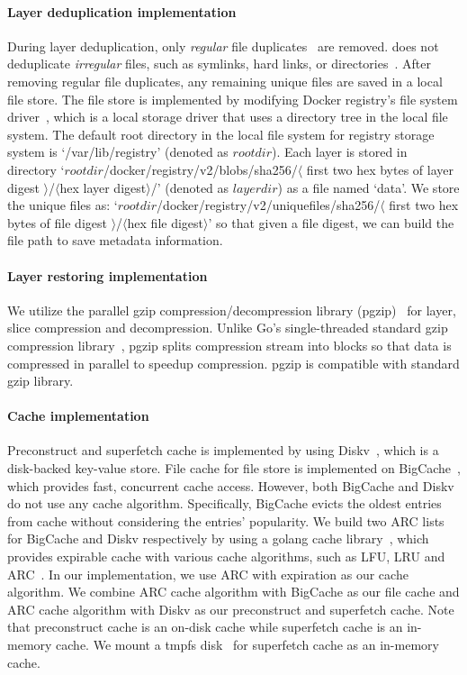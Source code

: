 \paragraph{Layer deduplication implementation}
During layer deduplication, only \emph{regular} file duplicates~\cite{xxx} are removed.
\sysname does not deduplicate \emph{irregular} files, such as symlinks, hard links, or directories~\cite{xxx}.
After removing regular file duplicates, any remaining unique files are saved in a local file store.
The file store is implemented by modifying Docker registry's file system driver~\cite{dockerfs},
which is a local storage driver 
that uses a directory tree in the local file system.
The default root directory in the local file system for registry storage system is `/var/lib/registry' (denoted as $rootdir$).
Each layer is stored in directory
`$rootdir$/docker/registry/v2/blobs/sha256/$\langle$
first two hex bytes of layer digest
$\rangle$/$\langle$hex layer digest$\rangle$/'
(denoted as $layerdir$) as a file named `data'.
We store the unique files as:
`$rootdir$/docker/registry/v2/uniquefiles/sha256/$\langle$
first two hex bytes of file digest
$\rangle$/$\langle$hex file digest$\rangle$'
so that given a file digest, we can build the file path to save metadata information.

\paragraph{Layer restoring implementation}
We utilize the parallel gzip compression/decompression library (pgzip)~\cite{pgzip}
for layer, slice compression and decompression.
Unlike Go's single-threaded standard gzip compression library~\cite{gogzip},
pgzip splits compression stream into blocks so that data is compressed in
parallel to speedup compression. pgzip is compatible with standard gzip library.

\paragraph{Cache implementation}

Preconstruct and superfetch cache is implemented by using Diskv~\cite{diskv},
which is a disk-backed key-value store.
File cache for file store is implemented on BigCache~\cite{bigcache},
which provides fast, concurrent cache access.
However, both BigCache and Diskv do not use any cache algorithm.
Specifically, BigCache evicts the oldest entries from cache without considering the entries' popularity.
We build two ARC lists for BigCache and Diskv respectively by using a golang cache library~\cite{xxx},
which provides expirable cache with various cache algorithms, such as LFU, LRU and ARC~\cite{megiddo2003arc}.
In our implementation, we use ARC with expiration as our cache algorithm.
We combine ARC cache algorithm with BigCache as our file cache
and ARC cache algorithm with Diskv as our preconstruct and superfetch cache.
Note that preconstruct cache is an on-disk cache while superfetch cache is an in-memory cache.
We mount a tmpfs disk~\cite{xxx} for superfetch cache as an in-memory cache.


